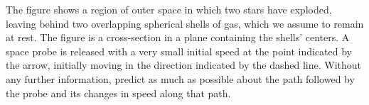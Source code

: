 The figure shows a region of outer space in which two stars have exploded, leaving behind two
overlapping spherical shells of gas, which we assume to remain at rest. The figure is a cross-section
in a plane containing the shells' centers. A space probe is released with a very small
initial speed at the point indicated by the arrow, initially moving in the direction
indicated by the dashed line. Without any further information, predict as much as possible
about the path followed by the probe and its changes in speed along that path.
